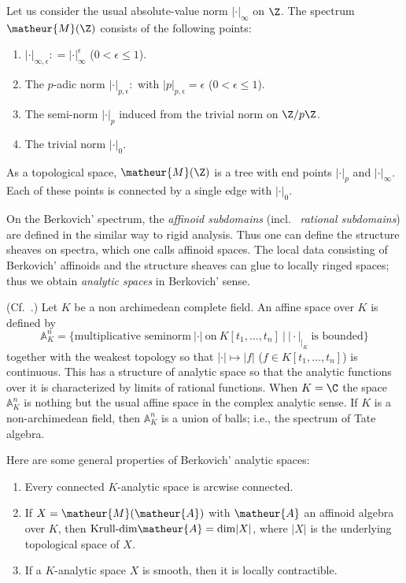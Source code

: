 \begin{appexa}
Let us consider the usual absolute-value norm $|\cdot|_{\infty}$
on $\Z$. The spectrum
$\matheur{M}(\Z)$ consists of the following points:
\begin{enumerate}
\item $|\cdot|_{\infty,\epsilon}\colon=|\cdot|_{\infty}^{\epsilon}$
($0<\epsilon\leq 1$).
\item The $p$-adic norm $|\cdot|_{p,\epsilon}\colon$ with 
$|p|_{p,\epsilon}=\epsilon$ ($0<\epsilon\leq 1$).
\item The semi-norm $|\cdot|_p$ induced from the trivial norm on $\Z/p\Z$.
\item The trivial norm $|\cdot|_0$.
\end{enumerate}
As a topological space, $\matheur{M}(\Z)$ is a tree with end points
$|\cdot|_p$ and $|\cdot|_{\infty}$. Each of these points is connected
by a single edge with $|\cdot|_0$.
\end{appexa}

On the Berkovich' spectrum, the {\it affinoid subdomains} (incl.\ {\it 
rational subdomains}) are defined in the similar way to rigid 
analysis. 
Thus one can define the structure sheaves on spectra, which 
one calls affinoid spaces.
The local data consisting of Berkovich' affinoids and the structure
sheaves can glue to locally ringed spaces; thus we obtain {\it analytic
spaces} in Berkovich' sense.

\begin{appexa}
(Cf.\ \cite[1.5]{staagonf}.)
Let $K$ be a non archimedean complete field. An affine space over $K$ is
defined by
\begin{equation*}
 \mathbb{A}^n_K=\{\textrm{multiplicative seminorm}\ |\cdot|\ \textrm{on}\ 
 K[t_1,\ldots,t_n]\ |\ |\cdot|_{|_K}\ \textrm{is bounded}\}
\end{equation*}
together with the weakest topology so that $|\cdot|\mapsto |f|$
($f\in K[t_1,\ldots,t_n]$) is continuous.
This has a structure of analytic space so that the analytic functions
over it is characterized by limits of rational functions.
When $K=\C$ the space $\mathbb{A}^n_K$ is nothing but the usual affine
space in the complex analytic sense.
If $K$ is a non-archimedean field, then $\mathbb{A}^n_K$ is a 
union of balls; i.e., the spectrum of Tate algebra.
\end{appexa}

Here are some general properties of Berkovich' analytic spaces:
\begin{enumerate}
\item Every connected $K$-analytic space is arcwise connected.
\item If $X=\matheur{M}(\matheur{A})$ with $\matheur{A}$ an affinoid algebra over
$K$, then $\textrm{Krull-dim}\matheur{A}=\mathrm{dim}|X|$, where $|X|$
is the underlying topological space of $X$.
\item If a $K$-analytic space $X$ is smooth, then it is locally
contractible.
\end{enumerate}

